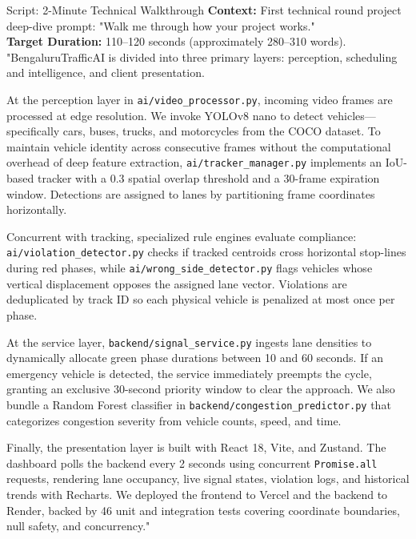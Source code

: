 \begin{interviewq}{Script: 2-Minute Technical Walkthrough}
\textbf{Context:} First technical round project deep-dive prompt: "Walk me through how your project works."\\
\textbf{Target Duration:} 110--120 seconds (approximately 280--310 words).
\tcblower
"BengaluruTrafficAI is divided into three primary layers: perception, scheduling and intelligence, and client presentation.

At the perception layer in \texttt{ai/video\_processor.py}, incoming video frames are processed at edge resolution. We invoke YOLOv8 nano to detect vehicles---specifically cars, buses, trucks, and motorcycles from the COCO dataset. To maintain vehicle identity across consecutive frames without the computational overhead of deep feature extraction, \texttt{ai/tracker\_manager.py} implements an IoU-based tracker with a 0.3 spatial overlap threshold and a 30-frame expiration window. Detections are assigned to lanes by partitioning frame coordinates horizontally.

Concurrent with tracking, specialized rule engines evaluate compliance: \texttt{ai/violation\_detector.py} checks if tracked centroids cross horizontal stop-lines during red phases, while \texttt{ai/wrong\_side\_detector.py} flags vehicles whose vertical displacement opposes the assigned lane vector. Violations are deduplicated by track ID so each physical vehicle is penalized at most once per phase.

At the service layer, \texttt{backend/signal\_service.py} ingests lane densities to dynamically allocate green phase durations between 10 and 60 seconds. If an emergency vehicle is detected, the service immediately preempts the cycle, granting an exclusive 30-second priority window to clear the approach. We also bundle a Random Forest classifier in \texttt{backend/congestion\_predictor.py} that categorizes congestion severity from vehicle counts, speed, and time.

Finally, the presentation layer is built with React 18, Vite, and Zustand. The dashboard polls the backend every 2 seconds using concurrent \texttt{Promise.all} requests, rendering lane occupancy, live signal states, violation logs, and historical trends with Recharts. We deployed the frontend to Vercel and the backend to Render, backed by 46 unit and integration tests covering coordinate boundaries, null safety, and concurrency."
\end{interviewq}

